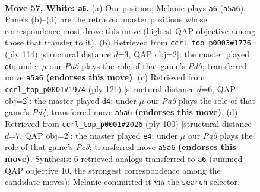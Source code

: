 \documentclass[11pt]{article}
\begin{document}
\clearpage

\begin{figure}[p]\centering
\begin{subfigure}{0.46\textwidth}\centering
\resizebox{\linewidth}{!}{%
\newchessgame
\chessboard[
  setfen={5rk1/8/8/P7/8/7K/8/4R3 w - - 17 57},
  showmover=false,
  pgfstyle=straightmove, color=movearrow, markmove={a5-a6}
]}
\caption{}
\end{subfigure}\hfill
\begin{subfigure}{0.46\textwidth}\centering
\resizebox{\linewidth}{!}{%
\newchessgame
\chessboard[
  setfen={8/3K4/5p2/3P4/4rk2/R7/8/8 w - - 0 58},
  showmover=false,
  pgfstyle=straightmove, color=movearrow, markmove={d5-d6}
]}
\caption{}
\end{subfigure}
\\[4pt]
\begin{subfigure}{0.46\textwidth}\centering
\resizebox{\linewidth}{!}{%
\newchessgame
\chessboard[
  setfen={5r2/8/8/3pk3/7P/6R1/6K1/8 b - - 2 61},
  showmover=false,
  pgfstyle=straightmove, color=movearrow, markmove={d5-d4}
]}
\caption{}
\end{subfigure}\hfill
\begin{subfigure}{0.46\textwidth}\centering
\resizebox{\linewidth}{!}{%
\newchessgame
\chessboard[
  setfen={8/5R2/rkp5/8/8/4P3/1K6/8 w - - 6 51},
  showmover=false,
  pgfstyle=straightmove, color=movearrow, markmove={e3-e4}
]}
\caption{}
\end{subfigure}
\caption{\textbf{Move 57, White: \texttt{a6}.} (a) Our position; Melanie plays \texttt{a6} (\texttt{a5a6}). Panels (b)--(d) are the retrieved master positions whose correspondence most drove this move (highest QAP objective among those that transfer to it). (b) Retrieved from \texttt{ccrl\_top\_p0003\#1776} (ply 114) [structural distance $d$=3, QAP obj=2]: the master played \texttt{d6}; under $\mu$ our \emph{Pa5} plays the role of that game's \emph{Pd5}; transferred move \texttt{a5a6} \textbf{(endorses this move)}. (c) Retrieved from \texttt{ccrl\_top\_p0001\#1974} (ply 121) [structural distance $d$=6, QAP obj=2]: the master played \texttt{d4}; under $\mu$ our \emph{Pa5} plays the role of that game's \emph{Pd4}; transferred move \texttt{a5a6} \textbf{(endorses this move)}. (d) Retrieved from \texttt{ccrl\_top\_p0001\#2026} (ply 100) [structural distance $d$=7, QAP obj=2]: the master played \texttt{e4}; under $\mu$ our \emph{Pa5} plays the role of that game's \emph{Pe3}; transferred move \texttt{a5a6} \textbf{(endorses this move)}. Synthesis: 6 retrieved analogs transferred to \texttt{a6} (summed QAP objective 10, the strongest correspondence among the candidate moves); Melanie committed it via the \texttt{search} selector.}
\label{fig:thought-m112}
\end{figure}
\end{document}
